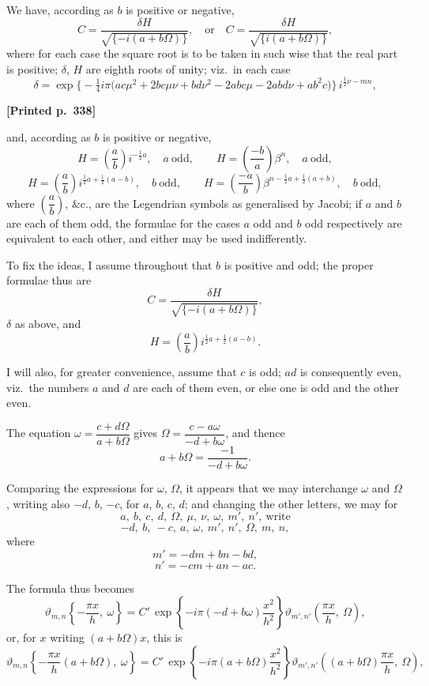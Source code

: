 \documentclass[11pt]{article}
\begin{document}
We have, according as $b$ is positive or negative,
\[
C = \frac{\delta H}{\sqrt{\{-i(a+b\Omega)\}}},\quad\text{or}\quad C = \frac{\delta H}{\sqrt{\{i(a+b\Omega)\}}},
\]
where for each case the square root is to be taken in such wise that the real part is positive; $\delta$, $H$ are eighth roots of unity; viz.\ in each case
\[
\delta = \exp\bigl\{-\tfrac{1}{4}i\pi\bigl(ac\mu^{2} + 2bc\mu\nu + bd\nu^{2} - 2abc\mu - 2abd\nu + ab^{2}c\bigr)\bigr\}\, i^{\tfrac{1}{2}\nu - mn},
\]

\medskip

\noindent\textbf{[Printed p.~338]}\hfill

\noindent and, according as $b$ is positive or negative,
\[
H = \left(\frac{a}{b}\right) i^{-\frac{1}{2}a},\quad a\ \text{odd}, \qquad H = \left(\frac{-b}{a}\right) \beta^{n},\quad a\ \text{odd},
\]
\[
H = \left(\frac{a}{b}\right) i^{\frac{1}{2}a + \frac{1}{2}(a - b)},\quad b\ \text{odd}, \qquad H = \left(\frac{-a}{b}\right) \beta^{n - \frac{1}{2}a + \frac{1}{2}(a + b)},\quad b\ \text{odd},
\]
where $\left(\dfrac{a}{b}\right)$, \&c., are the Legendrian symbols as generalised by Jacobi; if $a$ and $b$ are each of them odd, the formulae for the cases $a$ odd and $b$ odd respectively are equivalent to each other, and either may be used indifferently.

To fix the ideas, I assume throughout that $b$ is positive and odd; the proper formulae thus are
\[
C = \frac{\delta H}{\sqrt{\{-i(a+b\Omega)\}}},
\]
$\delta$ as above, and
\[
H = \left(\frac{a}{b}\right) i^{\frac{1}{2}a + \frac{1}{2}(a - b)}.
\]

I will also, for greater convenience, assume that $c$ is odd; $ad$ is consequently even, viz.\ the numbers $a$ and $d$ are each of them even, or else one is odd and the other even.

The equation $\omega = \dfrac{c + d\Omega}{a + b\Omega}$ gives $\Omega = \dfrac{c - a\omega}{-d + b\omega}$, and thence
\[
a + b\Omega = \frac{-1}{-d + b\omega}.
\]

Comparing the expressions for $\omega$, $\Omega$, it appears that we may interchange $\omega$ and $\Omega$, writing also $-d$, $b$, $-c$, for $a$, $b$, $c$, $d$; and changing the other letters, we may for
\[
a,\ b,\ c,\ d,\ \Omega,\ \mu,\ \nu,\ \omega,\ m',\ n',\ \text{write}
\]
\[
-d,\ b,\ -c,\ a,\ \omega,\ m',\ n',\ \Omega,\ m,\ n,
\]
where
\[
m' = -dm + bn - bd,
\]
\[
n' = -cm + an - ac.
\]

The formula thus becomes
\[
\vartheta_{m,n}\!\left\{-\frac{\pi x}{h},\ \omega\right\} = C'\,\exp\!\left\{-i\pi(-d+b\omega)\frac{x^{2}}{h^{2}}\right\}\vartheta_{m',n'}\!\left(\frac{\pi x}{h},\ \Omega\right),
\]
or, for $x$ writing $(a+b\Omega)x$, this is
\[
\vartheta_{m,n}\!\left\{-\frac{\pi x}{h}(a+b\Omega),\ \omega\right\} = C'\,\exp\!\left\{-i\pi(a+b\Omega)\frac{x^{2}}{h^{2}}\right\}\vartheta_{m',n'}\!\left((a+b\Omega)\frac{\pi x}{h},\ \Omega\right),
\]
\end{document}
